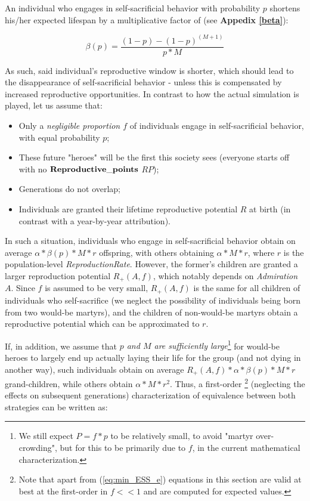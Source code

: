 \documentclass[a4paper,12pt]{report}
\begin{document}
An individual who engages in self-sacrificial behavior with probability $p$
 shortens his/her expected lifespan by a multiplicative factor of (see \textbf{Appedix \ref{beta}}):
 
\begin{equation}
 \beta(p) = \frac{(1-p) - (1-p)^{(M+1)}}{p*M} 
\label{eq_beta}
\end{equation}

As such, said individual's reproductive window is shorter, which should lead to the disappearance of
 self-sacrificial behavior - unless this is compensated by increased reproductive opportunities. In contrast to how the
 actual simulation is played, let us assume that: 
 \begin{itemize}
\item Only a \textit{negligible proportion $f$} of individuals engage in self-sacrificial behavior, with equal probability $p$;
\item These future "heroes" will be the first this society sees (everyone starts off with no $\bf{Reproductive\_points}$ $RP$);
\item Generations do not overlap;
\item Individuals are granted their lifetime reproductive potential $R$ at birth
(in contrast with a year-by-year attribution).
\end{itemize}
 
In such a situation, individuals who engage in self-sacrificial behavior obtain on average $\alpha*\beta(p)*M*r$ offspring, 
with others obtaining $\alpha*M*r$, where $r$ is the population-level \emph{ReproductionRate}. However,
the former's children are granted a larger reproduction potential $R_+(A,f)$, which notably
depends on \emph{Admiration} $A$. Since $f$ is assumed to be very small, $R_+(A,f)$ is the same for all
children of individuals who self-sacrifice (we neglect the possibility of individuals being born from two
would-be martyrs), and the children of non-would-be martyrs obtain a reproductive potential which can be
approximated to $r$.

If, in addition, we assume that \emph{$p$ and $M$ are sufficiently large}\footnote{We still expect
$P=f*p$ to be relatively small, to avoid "martyr over-crowding",
but for this to be primarily due to $f$, in the current mathematical characterization.}
for would-be heroes to largely end up
actually laying their life for the group (and not dying in another way), such individuals obtain 
on average $R_+(A,f)*\alpha*\beta(p)*M*r$ grand-children, 
while others obtain $\alpha*M*r^2$. Thus, a first-order
\footnote{Note that apart from (\ref{eq:min_ESS_e}) equations in this section are valid at best at the
first-order in $f<<1$ and are computed for expected values.}
(neglecting the effects on subsequent generations) characterization of equivalence between both strategies can be written as:
 
\end{document}
